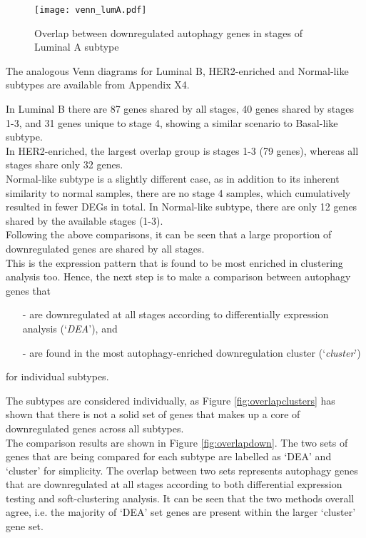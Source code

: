 \begin{wrapfigure}{L}{0.46\textwidth}
        \hfill
        \captionsetup{justification=centering}
        \centerline{ \texttt{[image: venn\_lumA.pdf]}}
        
        \vspace*{-4mm}
        \caption[Overlap between downregulated autophagy genes in stages of Luminal A subtype]{\label{fig:vennluma}Overlap between downregulated autophagy genes in stages of Luminal A subtype}
        \end{wrapfigure}
       

The analogous Venn diagrams for Luminal B, HER2-enriched and Normal-like subtypes are available from Appendix X4.

In Luminal B there are 87 genes shared by all stages, 40 genes shared by stages 1-3, and 31 genes unique to stage 4, showing a similar scenario to Basal-like subtype.\\In HER2-enriched, the largest overlap group is stages 1-3 (79 genes), whereas all stages share only 32 genes.\\Normal-like subtype is a slightly different case, as in addition to its inherent similarity to normal samples, there are no stage 4 samples, which cumulatively resulted in fewer DEGs in total. In Normal-like subtype, there are only 12 genes shared by the available stages (1-3). \\

\newpage
Following the above comparisons, it can be seen that a large proportion of downregulated genes are shared by all stages.\\ This is the expression pattern that is found to be most enriched in clustering analysis too. Hence, the next step is to make a comparison between autophagy genes that  \begin{itemize}
     \item[-] are downregulated at all stages according to differentially expression analysis (‘\textit{DEA}’),  and 
     \item[-] are found in the most autophagy-enriched downregulation cluster  (‘\textit{cluster}’)
\end{itemize}
for individual subtypes. 

The subtypes are considered individually, as Figure \ref{fig:overlapclusters} has shown that there is not a solid set of genes that makes up a core of downregulated genes across all subtypes.\\The comparison results are shown in Figure \ref{fig:overlapdown}. The two sets of genes that are being compared for each subtype are labelled as ‘DEA’ and ‘cluster’ for simplicity. The overlap between two sets represents autophagy genes that are downregulated at all stages according to both differential expression testing and soft-clustering analysis. It can be seen that the two methods overall agree, i.e. the majority of ‘DEA’ set genes are present within the larger ‘cluster’ gene set. 

